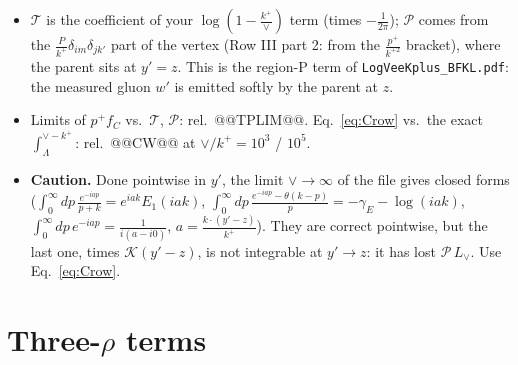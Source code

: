 \documentclass[10pt]{article}
\numberwithin{equation}{section}
\newcommand{\Lv}{L_{\vee}}
\newcommand{\KK}{\mathcal K}
\begin{document}
\begin{itemize}
\item $\mathcal T$ is the coefficient of your $\log(1-\frac{k^+}{\vee})$ term (times $-\frac{1}{2\pi}$); $\mathcal P$ comes from the $\frac{P}{k^+}\delta_{im}\delta_{jk'}$ part of the vertex (Row III part 2: from the $\frac{p^+}{k^{+2}}$ bracket), where the parent sits at $y'=z$. This is the region-P term of \texttt{LogVeeKplus\_BFKL.pdf}: the measured gluon $w'$ is emitted softly by the parent at $z$.
\item Limits of $p^+f_C$ vs.\ $\mathcal T$, $\mathcal P$: rel.\ @@TPLIM@@. Eq.~\eqref{eq:Crow} vs.\ the exact $\int_\Lambda^{\vee-k^+}$: rel.\ @@CW@@ at $\vee/k^+=10^3$ / $10^5$.
\item \textbf{Caution.} Done pointwise in $y'$, the limit $\vee\to\infty$ of the file gives closed forms ($\int_0^\infty dp\,\frac{e^{-iap}}{p+k}=e^{iak}E_1(iak)$, $\int_0^\infty dp\,\frac{e^{-iap}-\theta(k-p)}{p}=-\gamma_E-\log(iak)$, $\int_0^\infty dp\,e^{-iap}=\frac{1}{i(a-i0)}$, $a=\frac{k\cdot(y'-z)}{k^+}$). They are correct pointwise, but the last one, times $\KK(y'-z)$, is not integrable at $y'\to z$: it has lost $\mathcal P\,\Lv$. Use Eq.~\eqref{eq:Crow}.
\end{itemize}

\section{Three-\texorpdfstring{$\rho$}{rho} terms}\label{sec:three}
\end{document}
